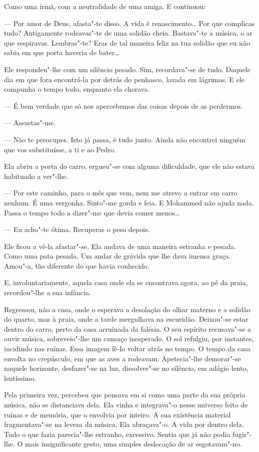 Como uma irmã, com a neutralidade de uma amiga. E continuou:

--- Por amor de Deus, afasta"-te disso. A vida é renascimento\ldots{} Por que
complicas tudo? Antigamente rodeavas"-te de uma solidão cheia. Bastava"-te
a música, o ar que respiravas. Lembras"-te? Eras de tal maneira feliz na
tua solidão que eu não sabia em que porta haveria de bater\ldots{}

Ele respondeu"-lhe com um silêncio pesado. Sim, recordava"-se de tudo.
Daquele dia em que fora encontrá-la por detrás do penhasco, lavada em
lágrimas. E ele compunha o tempo todo, enquanto ela chorava.

--- É bem verdade que só nos apercebemos das coisas depois de as
perdermos.

--- Assustas"-me.

--- Não te preocupes. Isto já passa, é tudo junto. Ainda não encontrei
ninguém que vos substituísse, a ti e ao Pedro.

Ela abriu a porta do carro, ergueu"-se com alguma dificuldade, que ele
não estava habituado a ver"-lhe.

--- Por este caminho, para o mês que vem, nem me atrevo a entrar em carro
nenhum. É uma vergonha. Sinto"-me gorda e feia. E Mohammed não ajuda
nada. Passa o tempo todo a dizer"-me que devia comer menos\ldots{}

--- Eu acho"-te ótima. Recuperas o peso depois.

Ele ficou a vê-la afastar"-se. Ela andava de uma maneira estranha e
pesada. Como uma pata pesada. Um andar de grávida que lhe dava imensa
graça. Amou"-a, tão diferente do que havia conhecido.

E, involuntariamente, aquela casa onde ela se encontrava agora, ao pé da
praia, recordou"-lhe a sua infância.

Regressou, não a casa, onde o esperava a desolação do olhar materno e a
solidão do quarto, mas à praia, onde a tarde mergulhava na escuridão.
Deixou"-se estar dentro do carro, perto da casa arruinada da falésia. O
seu espírito recusava"-se a ouvir música, sobreveio"-lhe um cansaço
inesperado. O sol refulgiu, por instantes, incidindo nas ruínas. Essa
imagem fê-lo voltar atrás no tempo. O tempo da casa envolta no
crepúsculo, em que as aves a rodeavam. Apetecia"-lhe demorar"-se naquele
horizonte, desfazer"-se na luz, dissolver"-se no silêncio, em adágio
lento, lentíssimo.

Pela primeira vez, percebeu que pensava em si como uma parte da sua
própria música, não se distanciava dela. Ela vinha e integrava"-o nesse
universo feito de ruínas e de memória, que o envolvia por inteiro. A sua
existência material fragmentava"-se na leveza da música. Ela abraçava"-o.
A vida por dentro dela. Tudo o que fazia parecia"-lhe estranho,
excessivo. Sentia que já não podia fugir"-lhe. O mais insignificante
gesto, uma simples deslocação de ar esgotavam"-no.

